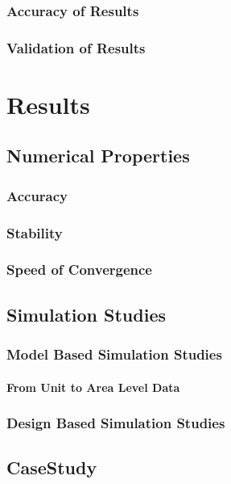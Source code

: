 \section{Accuracy of Results}
\section{Validation of Results}



\part{Results}\label{part:results}

\chapter{Numerical Properties}
\section{Accuracy}
\section{Stability}
\section{Speed of Convergence}

\chapter{Simulation Studies}
\section{Model Based Simulation Studies}

\subsection{From Unit to Area Level Data}


\section{Design Based Simulation Studies}

\chapter{CaseStudy}

